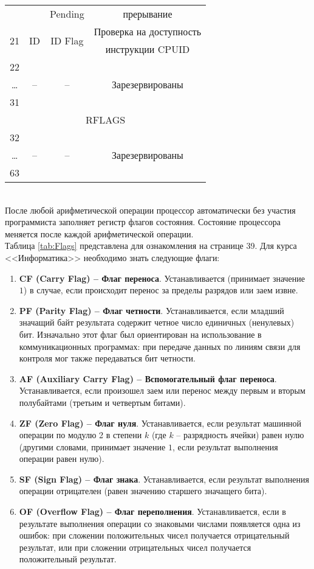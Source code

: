 \begin{table}[h]
\begin{tabular}{|c|c|c|c|}
\\ & & Pending & прерывание
\\ \multirow{2}{*}{21} & \multirow{2}{*}{ID} & \multirow{2}{*}{ID Flag} & Проверка на доступность
\\ & & & инструкции CPUID
\\ 22 & \multirow{3}{*}{--} & \multirow{3}{*}{--} & \multirow{3}{*}{Зарезервированы}
\\ \dots & & &
\\ 31 & & &
\\\hline
\multicolumn{4}{|c|}{RFLAGS} \\
\hline
32 & \multirow{3}{*}{--} & \multirow{3}{*}{--} & \multirow{3}{*}{Зарезервированы}
\\ \dots & & &
\\ 63 & & & \\
\hline
\end{tabular}
\end{table}
\\После любой арифметической операции процессор автоматически без участия программиста заполняет регистр флагов состояния. Состояние процессора меняется после каждой арифметической операции.
\\Таблица \ref{tab:Flags} представлена для ознакомления на странице 39. Для курса <<Информатика>> необходимо знать следующие флаги:
\begin{enumerate}
  \item \textbf{CF (Carry Flag) -- Флаг переноса}. Устанавливается (принимает значение $1$) в случае, если происходит перенос за пределы разрядов или заем извне.
  \item \textbf{PF (Parity Flag) -- Флаг четности}. Устанавливается, если младший значащий байт результата содержит четное число единичных (ненулевых) бит. Изначально этот флаг был ориентирован на использование в коммуникационных программах: при передаче данных по линиям связи для контроля мог также передаваться бит четности.
  \item \textbf{AF (Auxiliary Carry Flag) -- Вспомогательный флаг переноса}. Устанавливается, если произошел заем или перенос между первым и вторым полубайтами (третьим и четвертым битами).
  \item \textbf{ZF (Zero Flag) -- Флаг нуля}. Устанавливается, если результат машинной операции по модулю 2 в степени $k$ (где $k$ -- разрядность ячейки) равен нулю (другими словами, принимает значение $1$, если результат выполнения операции равен нулю).
  \item \textbf{SF (Sign Flag) -- Флаг знака}. Устанавливается, если результат выполнения операции отрицателен (равен значению старшего значащего бита).
  \item \textbf{OF (Overflow Flag) -- Флаг переполнения}. Устанавливается, если в результате выполнения операции со знаковыми числами появляется одна из ошибок: при сложении положительных чисел получается отрицательный результат, или при сложении отрицательных чисел получается положительный результат.
\end{enumerate}

